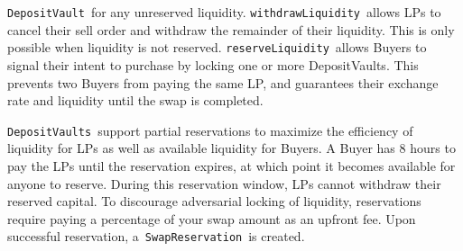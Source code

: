 \documentclass[
]{article}
\newcommand{\code}[1]{\texttt{#1}}
\begin{document}
{}

\hspace*{3em}{LPs can update the exchange rate on their }\code{DepositVault}{~for any unreserved
liquidity. }\code{withdrawLiquidity}{~allows LPs to cancel their sell order and withdraw
the remainder of their liquidity. This is only possible when liquidity
is not reserved. }\code{reserveLiquidity}{~}{allows Buyers to signal their intent to purchase
by locking one or more }{DepositVaults}{. This prevents two Buyers from
paying the same LP, and guarantees their exchange rate and liquidity
until the swap is completed. }

\hspace*{3em}\code{DepositVaults }{support partial
reservations to maximize the efficiency of liquidity for LPs as well as
available liquidity for Buyers. A Buyer has 8 hours to pay the LPs until
the reservation expires, at which point it becomes available for anyone
to reserve. During this reservation window, LPs cannot withdraw
their reserved capital. To discourage adversarial locking of
liquidity, reservations require paying a percentage of your swap amount
as an upfront fee. Upon successful reservation,
a}{~}\code{SwapReservation}{~is created.}
{}{}\vspace*{\baselineskip}
\end{document}
